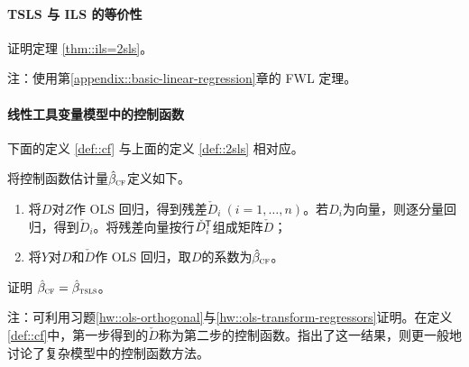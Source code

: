 \paragraph{TSLS 与 ILS 的等价性}\label{para::tsls-ils}
证明定理 \ref{thm::ils=2sls}。 


注：使用第\ref{appendix::basic-linear-regression}章的 FWL 定理。 



\paragraph{线性工具变量模型中的控制函数}\label{para::control-function-iv}

下面的定义 \ref{def::cf} 与上面的定义 \ref{def::2sls} 相对应。

\begin{definition}
[控制函数]\label{def::cf}
将控制函数估计量$\hat{\beta}_\textsc{cf}$定义如下。
\begin{enumerate}
\item
将$D$对$Z$作 OLS 回归，得到残差$\check D_i\ (i=1,\ldots, n)$。若$D_i$为向量，则逐分量回归，得到$\check D_i$。将残差向量按行$\check{D}_i^{\mkern-1.5mu\mathsf{T}} $组成矩阵$\check{D}$；
\item
将$Y$对$D$和$\check{D}$作 OLS 回归，取$D$的系数为$\hat{\beta}_\textsc{cf}$。  
\end{enumerate}
\end{definition}
 
 证明 $\hat{\beta}_\textsc{cf} = \hat{\beta}_\textsc{tsls}$。
 
 
 注：可利用习题\ref{hw::ols-orthogonal}与\ref{hw::ols-transform-regressors}证明。在定义\ref{def::cf}中，第一步得到的$\check{D}$称为第二步的控制函数。\citet{hausman1978specification}指出了这一结果，\citet{wooldridge2015control}则更一般地讨论了复杂模型中的控制函数方法。 
 
  


 

%
%
%
%
%


